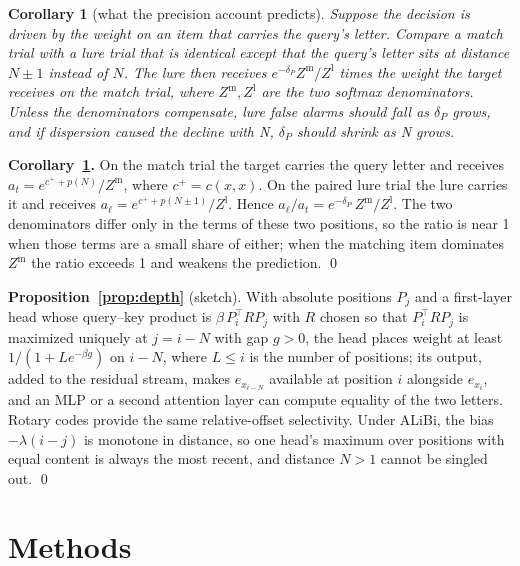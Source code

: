 \documentclass{article}
\newtheorem{corollary}{Corollary}
\begin{document}
\begin{corollary}[what the precision account predicts]\label{cor:lure}
Suppose the decision is driven by the weight on an item that carries the query's letter. Compare a match trial with a lure trial that is identical except that the query's letter sits at distance $N\pm1$ instead of $N$. The lure then receives $e^{-\delta_P}Z^{\text{m}}/Z^{\text{l}}$ times the weight the target receives on the match trial, where $Z^{\text{m}},Z^{\text{l}}$ are the two softmax denominators. Unless the denominators compensate, lure false alarms should fall as $\delta_P$ grows, and if dispersion caused the decline with N, $\delta_P$ should shrink as N grows.
\end{corollary}

\textbf{Corollary~\ref{cor:lure}.} On the match trial the target carries the query letter and receives $a_t=e^{c^+ +p(N)}/Z^{\text{m}}$, where $c^+=c(x,x)$. On the paired lure trial the lure carries it and receives $a_\ell=e^{c^+ +p(N\pm1)}/Z^{\text{l}}$. Hence $a_\ell/a_t=e^{-\delta_P}\,Z^{\text{m}}/Z^{\text{l}}$. The two denominators differ only in the terms of these two positions, so the ratio is near 1 when those terms are a small share of either; when the matching item dominates $Z^{\text{m}}$ the ratio exceeds 1 and weakens the prediction. \qed

\textbf{Proposition~\ref{prop:depth}} (sketch). With absolute positions $P_j$ and a first-layer head whose query--key product is $\beta\,P_i^\top R P_j$ with $R$ chosen so that $P_i^\top RP_j$ is maximized uniquely at $j=i-N$ with gap $g>0$, the head places weight at least $1/(1+Le^{-\beta g})$ on $i-N$, where $L\le i$ is the number of positions; its output, added to the residual stream, makes $e_{x_{i-N}}$ available at position $i$ alongside $e_{x_i}$, and an MLP or a second attention layer can compute equality of the two letters. Rotary codes provide the same relative-offset selectivity. Under ALiBi, the bias $-\lambda(i-j)$ is monotone in distance, so one head's maximum over positions with equal content is always the most recent, and distance $N>1$ cannot be singled out. \qed

\section{Methods}
\label{app:methods}
\end{document}
